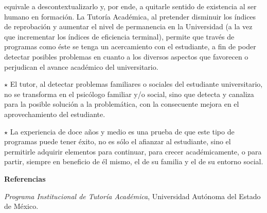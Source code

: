 \begin{Obs}
equivale a descontextualizarlo y, por ende, a quitarle sentido de existencia al ser
humano en formación. La Tutoría Académica, al pretender disminuir los
índices de reprobación y aumentar el nivel de permanencia en la Universidad
(a la vez que incrementar los índices de eficiencia terminal), permite que
través de programas como éste se tenga un acercamiento con el estudiante, a
fin de poder detectar posibles problemas en cuanto a los diversos aspectos
que favorecen o perjudican el avance académico del universitario.
\item[$\star$] El tutor, al detectar problemas familiares o sociales del estudiante
universitario, no se transforma en el psicólogo familiar y\slash{}o social, sino
que detecta y canaliza para la posible solución a la problemática, con la
consecuente mejora en el aprovechamiento del estudiante.
\item[$\star$] La experiencia de doce años y medio es una prueba de que este tipo de
programas puede tener éxito, no es sólo el afianzar al estudiante, sino el
permitirle adquirir elementos para continuar, para crecer académicamente, o
para partir, siempre en beneficio de él mismo, el de su familia y el de
su entorno social.
\end{Obs}
\newpage

\textbf{Referencias}


\textit{Programa Institucional de Tutoría Académica}, Universidad Autónoma
del Estado de México.

